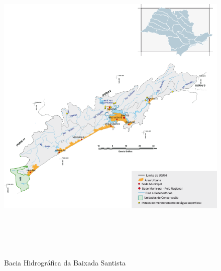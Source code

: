 	\begin{landscape}	
		\begin{figure}[h]
			\centering
			\caption{Bacia Hidrográfica da Baixada Santista}
			\includegraphics[width=15cm,height=15cm,keepaspectratio]{img/bacia_hidro.png}
			\label{mapa_bacia}
		\end{figure}
	\end{landscape}
	
